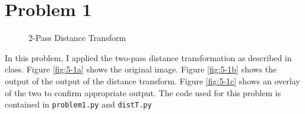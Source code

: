 \documentclass[aps,letterpaper,10pt]{article}
\newcommand{\ttt}{\texttt}
\begin{document}
\section{Problem 1}
\begin{figure}[!h]
\centering
{}\hspace{20px}
 \hspace{20px}
\caption{2-Pass Distance Transform}
\label{fig:5-1}
\end{figure}

In this problem, I applied the two-pass distance transformation as described in class.  Figure \ref{fig:5-1a} shows the original image.  Figure \ref{fig:5-1b} shows the output of the output of the distance transform.  Figure \ref{fig:5-1c} shows an overlay of the two to confirm appropriate output.  The code used for this problem is contained in \ttt{problem1.py} and \ttt{distT.py}


\newpage

\end{document}
